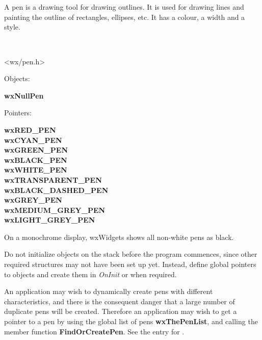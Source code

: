 
\section{}\label{wxpen}

A pen is a drawing tool for drawing outlines. It is used for drawing
lines and painting the outline of rectangles, ellipses, etc. It has a
colour, a width and a style.


\\


<wx/pen.h>




Objects:

{\bf wxNullPen}

Pointers:

{\bf wxRED\_PEN\\
wxCYAN\_PEN\\
wxGREEN\_PEN\\
wxBLACK\_PEN\\
wxWHITE\_PEN\\
wxTRANSPARENT\_PEN\\
wxBLACK\_DASHED\_PEN\\
wxGREY\_PEN\\
wxMEDIUM\_GREY\_PEN\\
wxLIGHT\_GREY\_PEN}


On a monochrome display, wxWidgets shows all non-white pens as black.

Do not initialize objects on the stack before the program commences,
since other required structures may not have been set up yet. Instead,
define global pointers to objects and create them in {\it OnInit} or
when required.

An application may wish to dynamically create pens with different
characteristics, and there is the consequent danger that a large number
of duplicate pens will be created. Therefore an application may wish to
get a pointer to a pen by using the global list of pens {\bf
wxThePenList}, and calling the member function {\bf FindOrCreatePen}.
See the entry for .

